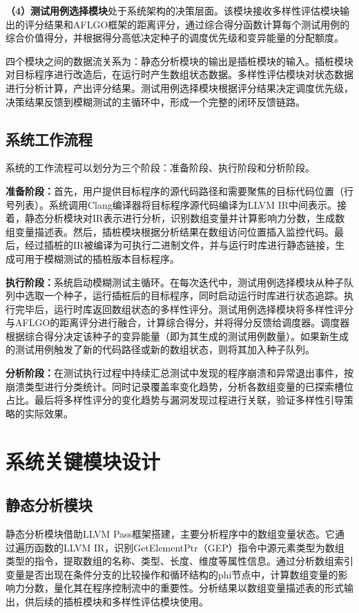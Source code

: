 \documentclass[bachelor]{njupthesis}
\begin{document}
\textbf{（4）测试用例选择模块}处于系统架构的决策层面。该模块接收多样性评估模块输出的评分结果和AFLGO框架的距离评分，通过综合得分函数计算每个测试用例的综合价值得分，并根据得分高低决定种子的调度优先级和变异能量的分配额度。

四个模块之间的数据流关系为：静态分析模块的输出是插桩模块的输入。插桩模块对目标程序进行改造后，在运行时产生数组状态数据。多样性评估模块对状态数据进行分析计算，产出评分结果。测试用例选择模块根据评分结果决定调度优先级，决策结果反馈到模糊测试的主循环中，形成一个完整的闭环反馈链路。

\subsection{系统工作流程}

系统的工作流程可以划分为三个阶段：准备阶段、执行阶段和分析阶段。

\textbf{准备阶段：}首先，用户提供目标程序的源代码路径和需要聚焦的目标代码位置（行号列表）。系统调用Clang编译器将目标程序源代码编译为LLVM IR中间表示。接着，静态分析模块对IR表示进行分析，识别数组变量并计算影响力分数，生成数组变量描述表。然后，插桩模块根据分析结果在数组访问位置插入监控代码。最后，经过插桩的IR被编译为可执行二进制文件，并与运行时库进行静态链接，生成可用于模糊测试的插桩版本目标程序。

\textbf{执行阶段：}系统启动模糊测试主循环。在每次迭代中，测试用例选择模块从种子队列中选取一个种子，运行插桩后的目标程序，同时启动运行时库进行状态追踪。执行完毕后，运行时库返回数组状态的多样性评分。测试用例选择模块将多样性评分与AFLGO的距离评分进行融合，计算综合得分，并将得分反馈给调度器。调度器根据综合得分决定该种子的变异能量（即为其生成的测试用例数量）。如果新生成的测试用例触发了新的代码路径或新的数组状态，则将其加入种子队列。

\textbf{分析阶段：}在测试执行过程中持续汇总测试中发现的程序崩溃和异常退出事件，按崩溃类型进行分类统计。同时记录覆盖率变化趋势，分析各数组变量的已探索槽位占比。最后将多样性评分的变化趋势与漏洞发现过程进行关联，验证多样性引导策略的实际效果。

\section{系统关键模块设计}

\subsection{静态分析模块}

静态分析模块借助LLVM Pass框架搭建，主要分析程序中的数组变量状态。它通过遍历函数的LLVM IR，识别GetElementPtr（GEP）指令中源元素类型为数组类型的指令，提取数组的名称、类型、长度、维度等属性信息。通过分析数组索引变量是否出现在条件分支的比较操作和循环结构的phi节点中，计算数组变量的影响力分数，量化其在程序控制流中的重要性。分析结果以数组变量描述表的形式输出，供后续的插桩模块和多样性评估模块使用。
\end{document}
